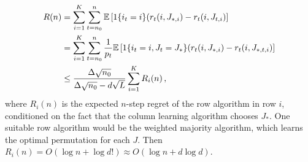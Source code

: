 \begin{align*}
  R(n)
  & = \sum_{i = 1}^K \sum_{t = n_0}^n \mathbb{E}\left[1\{i_t = i\} (r_t(i, J_{\ast, i}) - r_t(i, J_{t, i})\right] \\
  & = \sum_{i = 1}^K \sum_{t = n_0}^n \frac{1}{p_t} \mathbb{E}\left[1\{i_t = i, J_t = J_\ast\} (r_t(i, J_{\ast, i}) - r_t(i, J_{\ast, t, i})\right] \\
  & \leq \frac{\Delta \sqrt{n_0}}{\Delta \sqrt{n_0} - d \sqrt{L}} \sum_{i = 1}^K R_i(n)\,,
\end{align*}
where $R_i(n)$ is the expected $n$-step regret of the row algorithm in row $i$, conditioned on the fact that the column learning algorithm chooses $J_\ast$. One suitable row algorithm would be the weighted majority algorithm, which learns the optimal permutation for each $J$. Then $R_i(n) = O(\log n + \log d!) \approx O(\log n + d \log d)$.


